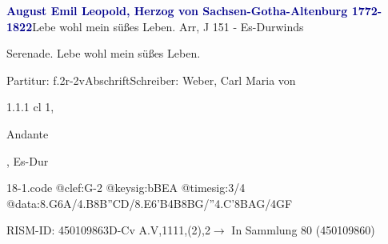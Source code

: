 \documentclass[a4paper, twocolumn, 11pt]{book}
\begin{document}
\par \vspace{16pt} \textcolor{darkblue}{\textbf{August Emil Leopold, Herzog von Sachsen-Gotha-Altenburg  1772-1822}}\hfillplus{[18]}\newline Lebe wohl mein süßes Leben. Arr, J 151 - Es-Dur\newline winds
\par \begin{itshape} Serenade. Lebe wohl mein süßes Leben.\end{itshape} 
\par \textcolor{darkblue}{}  Partitur: f.2r-2v\newline Abschrift\newline Schreiber: Weber, Carl Maria von
\par 1.1.1  cl 1, \begin{itshape}Andante\end{itshape}, Es-Dur  
\begin{filecontents*}{18-1.code}
@clef:G-2
@keysig:bBEA
@timesig:3/4
@data:{8.G6A}/4.B{8B''CD}/{8.E6'B}4B{8BG}/''4.C'{8BAG}/4GF
\end{filecontents*}
\newline %
\par RISM-ID: 450109863\newline D-Cv  A.V,1111,(2),2\newline $\rightarrow$ In Sammlung 80 (450109860)
      
\end{document}
